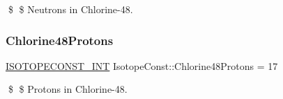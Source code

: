 \$ \$ Neutrons in Chlorine-\/48. \mbox{\label{group___isotope_const-_chlorine-_cl48_gaf8f77d44f4329e56123156597aa06578}} 
\subsubsection{\texorpdfstring{Chlorine48\+Protons}{Chlorine48Protons}}
{\footnotesize\ttfamily \mbox{\hyperlink{group___isotope_const-_macros_ga5f18360b3e99483a35c32d789e62621c}{I\+S\+O\+T\+O\+P\+E\+C\+O\+N\+S\+T\+\_\+\+I\+NT}} Isotope\+Const\+::\+Chlorine48\+Protons = 17}

\$ \$ Protons in Chlorine-\/48. 